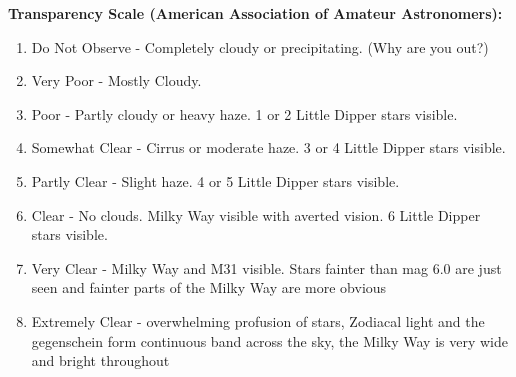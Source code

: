 \documentclass[10pt,twoside,a4paper]{article}
\begin{document}
\bigskip     
{\bf Transparency Scale (American Association of Amateur Astronomers):}
\begin{enumerate}
\item Do Not Observe - Completely cloudy or precipitating. (Why are you out?)
\item Very Poor - Mostly Cloudy. 
\item Poor - Partly cloudy or heavy haze. 1 or 2 Little Dipper stars visible. 
\item Somewhat Clear - Cirrus or moderate haze. 3 or 4 Little Dipper stars visible. 
\item Partly Clear - Slight haze. 4 or 5 Little Dipper stars visible. 
\item Clear - No clouds. Milky Way visible with averted vision. 6 Little Dipper stars visible. 
\item Very Clear - Milky Way and M31 visible. Stars fainter than mag 6.0 are just seen and fainter parts of the Milky Way are more obvious 
\item Extremely Clear - overwhelming profusion of stars, Zodiacal light and the gegenschein form continuous band across the sky, the Milky Way is very wide and bright throughout
\end{enumerate}
\newpage
\end{document}
